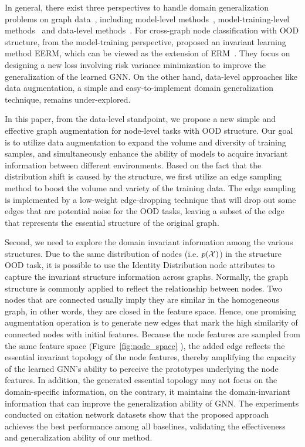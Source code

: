 In general, there exist three perspectives to handle domain generalization problems on graph data~\cite{li2022out}, including  model-level methods~\cite{li2021disentangled,li2022ood}, model-training-level methods~\cite{liu2022confidence,wu2022discovering} and data-level methods~\cite{rongdropedge,you2020graph}.  For cross-graph node classification with OOD structure, 
from the model-training perspective, \citet{wuhandling} 
proposed an invariant learning method EERM, which can be viewed as the extension of ERM~\cite{arjovsky2020invariant}. They focus on designing a new loss involving risk variance minimization to improve the generalization of the learned GNN. On the other hand, 
 data-level approaches like data augmentation, a simple and
easy-to-implement domain generalization technique, remains under-explored.


In this paper, from the data-level standpoint, we propose a new simple and effective graph augmentation  for node-level tasks with OOD structure. Our goal is to utilize data augmentation to expand the volume and diversity of training samples, and simultaneously enhance the ability of models to acquire invariant information between different environments. 
Based on the fact that the distribution shift is caused by the structure,  we first utilize an edge sampling method to boost the volume and variety of the training data. The edge sampling is implemented by a low-weight edge-dropping technique that will drop out some edges that are potential noise for the OOD tasks, leaving a subset of the edge that represents the essential structure of the original graph. 

Second, we need to explore the domain invariant information among the various structures.  Due to the same distribution of nodes (i.e. $p(\mathcal{X})$) in the structure OOD task, it is possible to use the Identity Distribution node attributes to capture the invariant structure information across graphs. Normally, the graph structure is commonly applied to reflect the relationship between nodes. Two nodes that are connected usually imply they are similar in the homogeneous graph, in other words, they are closed in the feature space. Hence, one promising augmentation operation is to generate new edges that mark the high similarity of connected nodes with initial features. Because the node features are sampled from the same feature space (Figure~\ref{fig:node_space} ), the added edge reflects the essential invariant topology of the node features, thereby amplifying the  capacity of the learned GNN's ability to perceive the prototypes underlying the node features. In addition, the generated essential topology may not focus on the domain-specific information, on the contrary, it maintains the domain-invariant information that can improve the generalization ability of GNN. 
The experiments
conducted on citation network datasets show that the proposed approach achieves the best performance
among all baselines, validating the effectiveness and generalization ability of our method.


